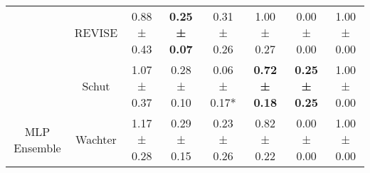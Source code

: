 \begin{table}
{\begin{tabular}[t]{cccccccc}
 & REVISE & 0.88 ± 0.43\hphantom{*}\hphantom{*} & \textbf{0.25 ± 0.07}\hphantom{*}\hphantom{*} & 0.31 ± 0.26\hphantom{*}\hphantom{*} & 1.00 ± 0.27\hphantom{*}\hphantom{*} & 0.00 ± 0.00\hphantom{*}\hphantom{*} & 1.00 ± 0.00\hphantom{*}\hphantom{*}\\

 & Schut & 1.07 ± 0.37\hphantom{*}\hphantom{*} & 0.28 ± 0.10\hphantom{*}\hphantom{*} & 0.06 ± 0.17*\hphantom{*} & \textbf{0.72 ± 0.18}\hphantom{*}\hphantom{*} & \textbf{0.25 ± 0.25}\hphantom{*}\hphantom{*} & 1.00 ± 0.00\hphantom{*}\hphantom{*}\\

\multirow[t]{-9}{*}{\centering\arraybackslash MLP Ensemble} & Wachter & 1.17 ± 0.28\hphantom{*}\hphantom{*} & 0.29 ± 0.15\hphantom{*}\hphantom{*} & 0.23 ± 0.26\hphantom{*}\hphantom{*} & 0.82 ± 0.22\hphantom{*}\hphantom{*} & 0.00 ± 0.00\hphantom{*}\hphantom{*} & 1.00 ± 0.00\hphantom{*}\hphantom{*}\\
\bottomrule
\end{tabular}}
\end{table}
